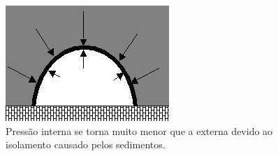 \begin{figure}[h!]
    \centering
    \includegraphics[width=0.6\columnwidth]{figs/modos/op_rem_3/op_rem_3_2.jpg}
    \caption{Pressão interna se torna muito menor que a externa devido ao
    isolamento causado pelos sedimentos.}
    \label{fig:op:rem:3_2}
\end{figure}
% 

